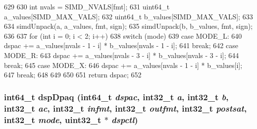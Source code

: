 \begin{DoxyCode}
629 {
630     int nvals = SIMD_NVALS[fmt];
631     uint64_t a_values[SIMD_MAX_VALS];
632     uint64_t b_values[SIMD_MAX_VALS];
633 
634     simdUnpack(a, a_values, fmt, sign);
635     simdUnpack(b, b_values, fmt, sign);
636 
637     for (int i = 0; i < 2; i++) {
638         switch (mode) {
639           case MODE_L:
640             dspac += a_values[nvals - 1 - i] * b_values[nvals - 1 - i];
641             break;
642           case MODE_R:
643             dspac += a_values[nvals - 3 - i] * b_values[nvals - 3 - i];
644             break;
645           case MODE_X:
646             dspac += a_values[nvals - 1 - i] * b_values[i];
647             break;
648         }
649     }
650 
651     return dspac;
652 }
\end{DoxyCode}
\hypertarget{namespaceMipsISA_a972387186c5bda88a6be1af70b202fd6}{
\subsubsection[{dspDpaq}]{\setlength{\rightskip}{0pt plus 5cm}int64\_\-t dspDpaq (int64\_\-t {\em dspac}, \/  int32\_\-t {\em a}, \/  int32\_\-t {\em b}, \/  int32\_\-t {\em ac}, \/  int32\_\-t {\em infmt}, \/  int32\_\-t {\em outfmt}, \/  int32\_\-t {\em postsat}, \/  int32\_\-t {\em mode}, \/  {\bf uint32\_\-t} $\ast$ {\em dspctl})}}
\label{namespaceMipsISA_a972387186c5bda88a6be1af70b202fd6}




